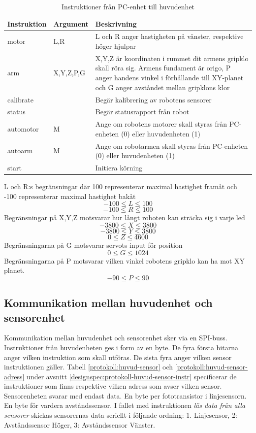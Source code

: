 \begin{table}[h]
	\centering
		\begin{tabularx}{\textwidth}{| l | l | X |}
			\hline
			\textbf{Instruktion} & \textbf{Argument} & \textbf{Beskrivning} \\
			\hline
			{motor} & {L,R} & {L och R anger hastigheten på vänster, respektive höger hjulpar} \\
			\hline
			{arm} & {X,Y,Z,P,G} & {X,Y,Z är koordinaten i rummet dit armens gripklo skall röra sig. Armens fundament är origo, P anger handens vinkel i förhållande till XY-planet och G anger avståndet mellan gripklons klor} \\
			\hline
			{calibrate} & {} & {Begär kalibrering av robotens sensorer} \\
			\hline
			{status} & {} & {Begär statusrapport från robot} \\
			\hline
			{automotor} & {M} & {Ange om robotens motorer skall styras från PC-enheten (0) eller huvudenheten (1)} \\
			\hline
			{autoarm} & {M} & {Ange om robotarmen skall styras från PC-enheten (0) eller huvudenheten (1)} \\
			\hline
			{start} & {} & {Initiera körning} \\
			\hline
		\end{tabularx}
	\caption{Instruktioner från PC-enhet till huvudenhet} \label{protokoll:pc-huvud}
\end{table}
L och R:s begränsningar där 100 representerar maximal hastighet framåt och -100 representerar maximal hastighet bakåt
$$-100\leq L \leq 100$$
$$-100\leq R \leq 100$$
Begränsningar på X,Y,Z motsvarar hur långt roboten kan sträcka sig i varje led
$$-3800\leq X \leq 3800$$
$$-3800\leq Y \leq 3800$$
$$0\leq Z \leq 4600$$
Begränsningarna på G motsvarar servots input för position
$$0\leq G \leq 1024$$
Begränsningarna på P motsvarar vilken vinkel robotens gripklo kan ha mot XY planet.
$$-90\leq P \leq 90$$


\subsection{Kommunikation mellan huvudenhet och sensorenhet}
Kommunikation mellan huvudenhet och sensorenhet sker via en SPI-buss. Instruktioner från huvudenheten ges i form av en byte. De fyra första bitarna anger vilken instruktion som skall utföras. De sista fyra anger vilken sensor instruktionen gäller. Tabell \ref{protokoll:huvud-sensor} och \ref{protokoll:huvud-sensor-adress} under avsnitt \ref{designspec:protokoll-huvud-sensor-instr} specificerar de instruktioner som finns respektive vilken adress som avser vilken sensor. \\
Sensorenheten svarar med endast data. En byte per fototransistor i linjesensorn. En byte för vardera avståndssensor. I fallet med instruktionen \textit{läs data från alla sensorer} skickas sensorernas data seriellt i följande ordning: 1. Linjesensor, 2: Avståndssensor Höger, 3: Avståndssensor Vänster.

